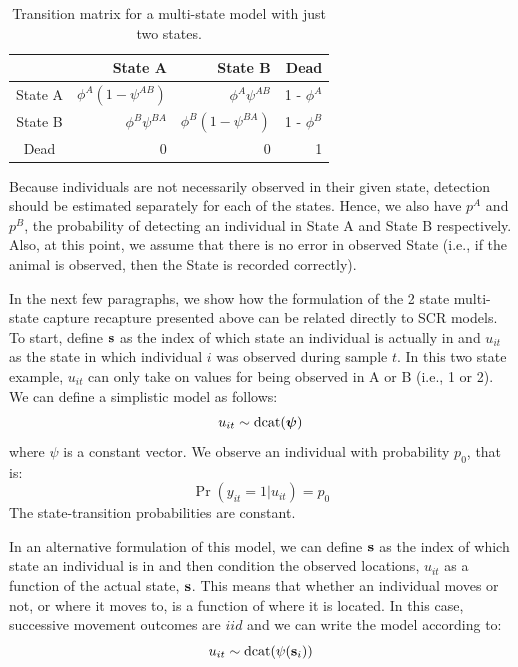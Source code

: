 \begin{table}[htb!]
\centering
\caption{
Transition matrix for a multi-state model with just two states.
}
\begin{tabular}{crrr}
\hline \hline
    &   State A &   State B   &   Dead \\  \hline
State A & $\phi^A(1-\psi^{AB})$ & $\phi^A \psi^{AB}$ & 1 - $\phi^A$ \\
State B & $\phi^B \psi^{BA}$ & $\phi^B(1-\psi^{BA})$ & 1 - $\phi^B$ \\
Dead & 0 & 0 & 1\\ \hline
\end{tabular}
\label{open.tab.CJSmulti-matrix}
\end{table}

Because individuals are not necessarily observed in their given state,
detection should be estimated separately for each of the states.
Hence, we also have $p^A$ and $p^B$, the probability of detecting an
individual in State A and State B respectively.  Also, at this point, we assume that there is no error 
in observed State (i.e., if the animal is observed, then the State is recorded correctly).  

In the next few paragraphs,
we show how
the formulation of the 2 state multi-state capture recapture presented above 
can be related directly to SCR models.  
To start, define ${\bf s}$
as the index of which state an individual is actually in 
and $u_{it}$ as
the state in which individual $i$ was observed during sample $t$.  In this two state example,
$u_{it}$ can only take on values for being observed in A or B (i.e., 1 or 2).
We can define a simplistic model as follows:
\[
u_{it} \sim  \mathrm{dcat}(\mbox{\boldmath$\psi$})
\]
where $\psi$ is a constant vector.
We observe an individual with probability $p_{0}$, that is:
\[
 \Pr(y_{it} = 1| u_{it} )  = p_{0}
\]
The state-transition probabilities are constant.

In an alternative formulation of this model, 
we can define ${\bf s}$
as the index of which state
an individual is in and then condition the observed locations, $u_{it}$
as a function of the actual state, ${\bf s}$. This
means that whether an individual moves or not, or where it moves to, is a function of where it is located.
In this case, 
successive movement outcomes 
are $iid$ and we can write the model according to:
\[
u_{it} \sim  \text{dcat}( {\psi}({\bf s}_{i}) )
\]

